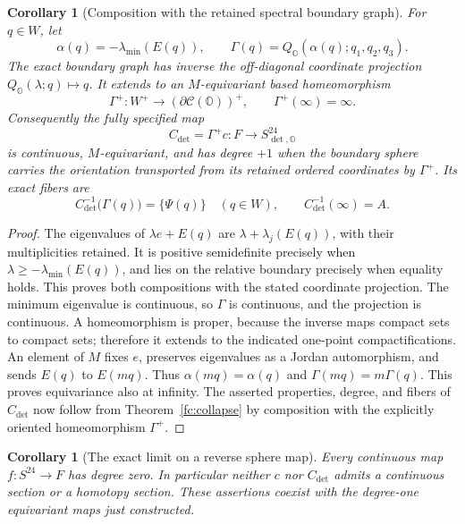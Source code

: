 \documentclass[11pt]{article}
\newtheorem{corollary}[theorem]{Corollary}
\theoremstyle{definition}
\begin{document}
\begin{corollary}[Composition with the retained spectral boundary graph]
\label{fc:boundary-composite}
For $q\in W$, let
\[
 \alpha(q)=-\lambda_{\min}(E(q)),\qquad
 \Gamma(q)=Q_{\mathbb O}(\alpha(q);q_1,q_2,q_3).
\]
The exact boundary graph has inverse the off-diagonal coordinate
projection $Q_{\mathbb O}(\lambda;q)\mapsto q$. It extends to an
$M$-equivariant based homeomorphism
\[
 \Gamma^+:W^+\longrightarrow
 (\partial\mathcal C(\mathbb O))^+,
 \qquad\Gamma^+(\infty)=\infty.
\]
Consequently the fully specified map
\begin{equation}
 C_{\det}=\Gamma^+c:F\longrightarrow
           S_{\det,\mathbb O}^{24}
 \label{fc:determinant-collapse}
\end{equation}
is continuous, $M$-equivariant, and has degree $+1$ when the
boundary sphere carries the orientation transported from its
retained ordered coordinates by $\Gamma^+$. Its exact fibers are
\[
 C_{\det}^{-1}\bigl(\Gamma(q)\bigr)=\{\Psi(q)\}
 \quad(q\in W),\qquad C_{\det}^{-1}(\infty)=A.
\]
\end{corollary}

\begin{proof}
The eigenvalues of $\lambda e+E(q)$ are
$\lambda+\lambda_j(E(q))$, with their multiplicities retained.
It is positive semidefinite precisely when
$\lambda\ge-\lambda_{\min}(E(q))$, and lies on the relative
boundary precisely when equality holds. This proves both
compositions with the stated coordinate projection. The minimum
eigenvalue is continuous, so $\Gamma$ is continuous, and the
projection is continuous. A homeomorphism is proper, because the
inverse maps compact sets to compact sets; therefore it extends
to the indicated one-point compactifications.
An element of $M$ fixes $e$, preserves eigenvalues as a Jordan
automorphism, and sends $E(q)$ to $E(mq)$. Thus
$\alpha(mq)=\alpha(q)$ and $\Gamma(mq)=m\Gamma(q)$.
This proves equivariance also at infinity. The asserted
properties, degree, and fibers of $C_{\det}$ now follow from
Theorem~\ref{fc:collapse} by composition with the explicitly
oriented homeomorphism $\Gamma^+$.
\end{proof}

\begin{corollary}[The exact limit on a reverse sphere map]
\label{fc:no-reverse-degree}
Every continuous map $f:S^{24}\to F$ has degree zero.
In particular neither $c$ nor $C_{\det}$ admits a continuous
section or a homotopy section. These assertions coexist with
the degree-one equivariant maps just constructed.
\end{corollary}
\end{document}
